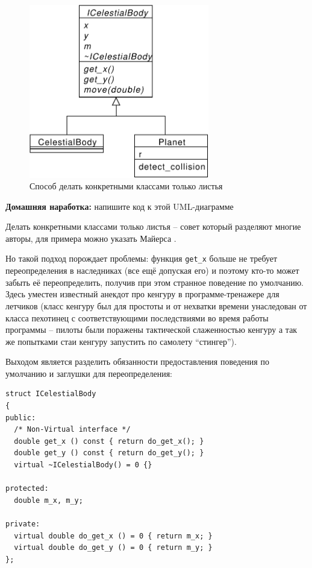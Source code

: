 \documentclass[a4paper,12pt,oneside]{book}
\begin{document}
\begin{figure}[h!]
\centering
\includegraphics[width=0.7\textwidth]{illustrations/better-implinh-crop.pdf}
\caption{Способ делать конкретными классами только листья}
\label{fig:better-implinhh}
\end{figure}

\textbf{Домашняя наработка:} напишите код к этой UML-диаграмме

Делать конкретными классами только листья -- совет который разделяют многие авторы, для примера можно указать Майерса \cite{effcpp3d}.

Но такой подход порождает проблемы: функция \lstinline!get_x! больше не требует переопределения в наследниках (все ещё допуская его) и поэтому кто-то может забыть её переопределить, получив при этом странное поведение по умолчанию. Здесь уместен известный анекдот про кенгуру в программе-тренажере для летчиков (класс кенгуру был для простоты и от нехватки времени унаследован от класса пехотинец с соответствующими последствиями во время работы программы -- пилоты были поражены тактической слаженностью кенгуру а так же попытками стаи кенгуру запустить по самолету ``стингер'').

Выходом является разделить обязанности предоставления поведения по умолчанию и заглушки для переопределения:

\begin{lstlisting}
struct ICelestialBody
{
public:
  /* Non-Virtual interface */
  double get_x () const { return do_get_x(); }
  double get_y () const { return do_get_y(); }
  virtual ~ICelestialBody() = 0 {}

protected:
  double m_x, m_y;

private:
  virtual double do_get_x () = 0 { return m_x; }
  virtual double do_get_y () = 0 { return m_y; }
};
\end{lstlisting}
\end{document}
